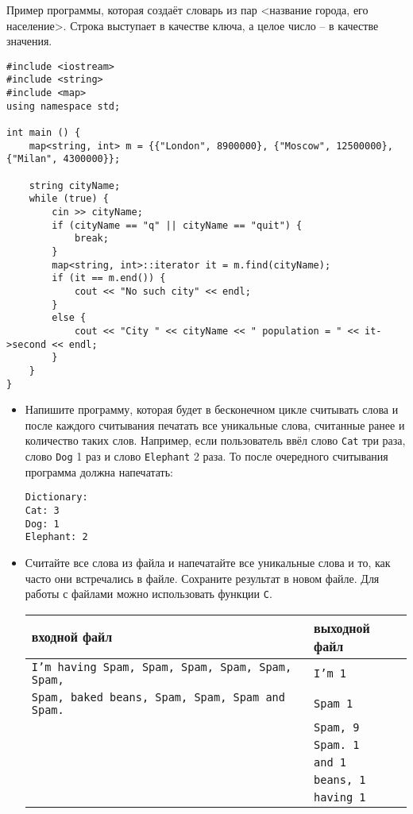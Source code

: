 \documentclass{article}
\begin{document}
Пример программы, которая создаёт словарь из пар <название города, его население>. Строка выступает в качестве ключа, а целое число -- в качестве значения.
\begin{lstlisting}
#include <iostream>
#include <string>
#include <map>
using namespace std;

int main () {
    map<string, int> m = {{"London", 8900000}, {"Moscow", 12500000}, {"Milan", 4300000}};

    string cityName;
    while (true) {
        cin >> cityName;
        if (cityName == "q" || cityName == "quit") {
            break;
        }
        map<string, int>::iterator it = m.find(cityName);
        if (it == m.end()) {
            cout << "No such city" << endl;
        }
        else {
            cout << "City " << cityName << " population = " << it->second << endl;
        }
    }
}
\end{lstlisting}


\newpage
\begin{itemize}
\item Напишите программу, которая будет в бесконечном цикле считывать слова и после каждого считывания печатать все уникальные слова, считанные ранее и количество таких слов. Например, если пользователь ввёл слово \texttt{Cat} три раза, слово \texttt{Dog} 1 раз и слово \texttt{Elephant} 2 раза. То после очередного считывания программа должна напечатать:
\begin{verbatim}
Dictionary:
Cat: 3
Dog: 1
Elephant: 2
\end{verbatim}
\item Считайте все слова из файла и напечатайте все уникальные слова и то, как часто они встречались в файле. Сохраните результат в новом файле. Для работы с файлами можно использовать функции \texttt{C}.
\begin{center}
\begin{tabular}{ l | l }
 входной файл & выходной файл \\ \hline
 \texttt{I'm having Spam, Spam, Spam, Spam, Spam, Spam,} & \texttt{I'm 1}  \\
 \texttt{Spam, baked beans, Spam, Spam, Spam and Spam.}  &  \texttt{Spam 1}  \\
                                                         &  \texttt{Spam, 9}  \\ 
                                                         &  \texttt{Spam. 1}  \\ 
                                                         &  \texttt{and 1}  \\ 
                                                         &  \texttt{beans, 1}  \\ 
                                                         &  \texttt{having 1}  \\                                                      
\end{tabular}
\end{center}
\end{itemize}
\end{document}

